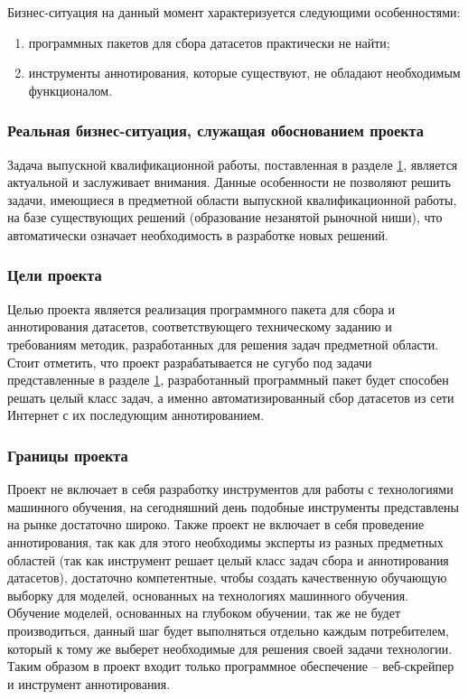 \documentclass[../main]{subfiles}
\begin{document}
Бизнес-ситуация на данный момент характеризуется следующими особенностями:
\begin{enumerate}
    \item программных пакетов для сбора датасетов практически не найти;
    \item инструменты аннотирования, которые существуют, не обладают необходимым функционалом.
\end{enumerate}

\subsubsection{Реальная бизнес-ситуация, служащая обоснованием проекта}
Задача выпускной квалификационной работы, поставленная в разделе \hyperref[sec:subject_domain]{1}, является актуальной и заслуживает внимания. Данные особенности не позволяют решить задачи, имеющиеся в предметной области выпускной квалификационной работы, на базе существующих решений (образование незанятой рыночной ниши), что автоматически означает необходимость в разработке новых решений. 

\subsubsection{Цели проекта}
Целью проекта является реализация программного пакета для сбора и аннотирования датасетов, соответствующего техническому заданию и требованиям методик, разработанных для решения задач предметной области. Стоит отметить, что проект разрабатывается не сугубо под задачи представленные в разделе \hyperref[sec:subject_domain]{1}, разработанный программный пакет будет способен решать целый класс задач, а именно автоматизированный сбор датасетов из сети Интернет с их последующим аннотированием. 

\subsubsection{Границы проекта}
Проект не включает в себя разработку инструментов для работы с технологиями машинного обучения, на сегодняшний день подобные инструменты представлены на рынке достаточно широко. Также проект не включает в себя проведение аннотирования, так как для этого необходимы эксперты из разных предметных областей (так как инструмент решает целый класс задач сбора и аннотирования датасетов), достаточно компетентные, чтобы создать качественную обучающую выборку для моделей, основанных на технологиях машинного обучения. Обучение моделей, основанных на глубоком обучении, так же не будет производиться, данный шаг будет выполняться отдельно каждым потребителем, который к тому же выберет необходимые для решения своей задачи технологии. Таким образом в проект входит только программное обеспечение -- веб-скрейпер и инструмент аннотирования.
\end{document}

